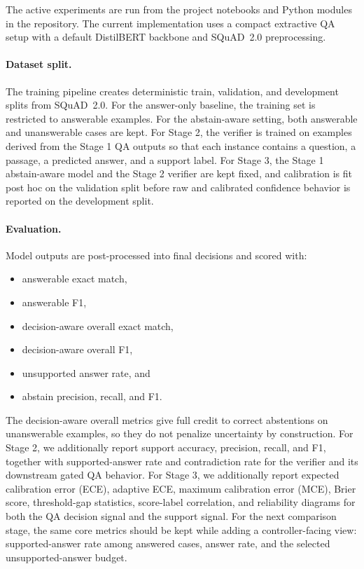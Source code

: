The active experiments are run from the project notebooks and Python modules in
the repository.
The current implementation uses a compact extractive QA setup with a default
DistilBERT backbone and SQuAD~2.0 preprocessing.

\paragraph{Dataset split.}
The training pipeline creates deterministic train, validation, and development
splits from SQuAD~2.0.
For the answer-only baseline, the training set is restricted to answerable
examples.
For the abstain-aware setting, both answerable and unanswerable cases are kept.
For Stage 2, the verifier is trained on examples derived from the Stage 1 QA
outputs so that each instance contains a question, a passage, a predicted
answer, and a support label.
For Stage 3, the Stage 1 abstain-aware model and the Stage 2 verifier are kept
fixed, and calibration is fit post hoc on the validation split before raw and
calibrated confidence behavior is reported on the development split.

\paragraph{Evaluation.}
Model outputs are post-processed into final decisions and scored with:
\begin{itemize}[leftmargin=1.25em]
  \item answerable exact match,
  \item answerable F1,
  \item decision-aware overall exact match,
  \item decision-aware overall F1,
  \item unsupported answer rate, and
  \item abstain precision, recall, and F1.
\end{itemize}
The decision-aware overall metrics give full credit to correct abstentions on
unanswerable examples, so they do not penalize uncertainty by construction.
For Stage 2, we additionally report support accuracy, precision, recall, and
F1, together with supported-answer rate and contradiction rate for the verifier
and its downstream gated QA behavior.
For Stage 3, we additionally report expected calibration error (ECE), adaptive
ECE, maximum calibration error (MCE), Brier score, threshold-gap statistics,
score-label correlation, and reliability diagrams for both the QA decision
signal and the support signal.
For the next comparison stage, the same core metrics should be kept while
adding a controller-facing view:
supported-answer rate among answered cases, answer rate, and the selected
unsupported-answer budget.

